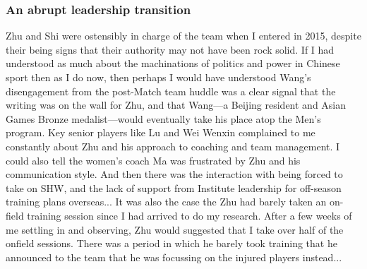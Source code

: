


\subsubsection{An abrupt leadership transition}
Zhu and Shi were ostensibly in charge of the team when I entered in 2015, despite their being signs that their authority may not have been rock solid.  If I had understood as much about the machinations of politics and power in Chinese sport then as I do now, then perhaps I would have understood Wang's disengagement from the post-Match team huddle was a clear signal that the writing was on the wall for Zhu, and that Wang---a Beijing resident and Asian Games Bronze medalist---would eventually take his place atop the Men's program.  Key senior players like Lu and Wei Wenxin complained to me constantly about Zhu and his approach to coaching and team management.  I could also tell the women's coach Ma was frustrated by Zhu and his communication style.  And then there was the interaction with being forced to take on SHW, and the lack of support from Institute leadership for off-season training plans overseas... It was also the case the Zhu had barely taken an on-field training session since I had arrived to do my research.  After a few weeks of me settling in and observing, Zhu would suggested that I take over half of the onfield sessions.  There was a period in which he barely took training that he announced to the team that he was focussing on the injured players instead...

